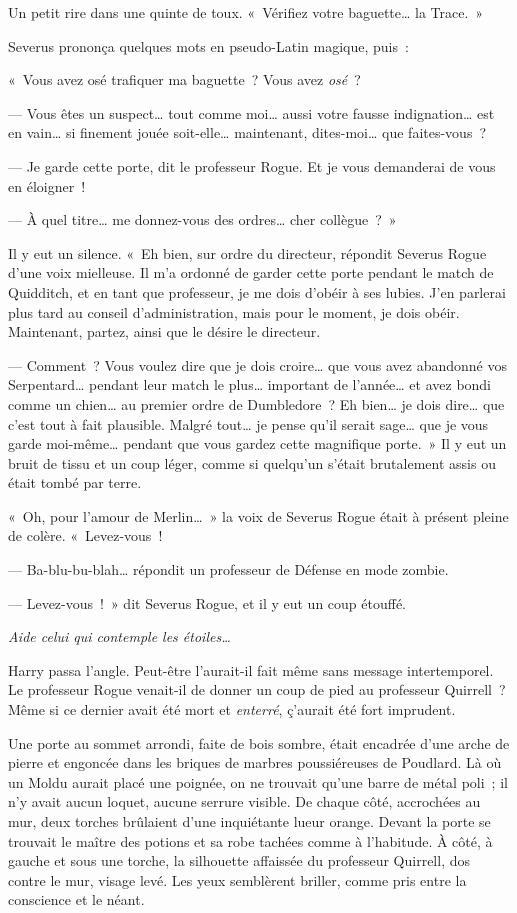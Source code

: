 Un petit rire dans une quinte de toux. «~Vérifiez votre baguette… la Trace.~»

Severus prononça quelques mots en pseudo-Latin magique, puis~:

«~Vous avez osé trafiquer ma baguette~? Vous avez \emph{osé}~?

--- Vous êtes un suspect… tout comme moi… aussi votre fausse indignation… est en vain… si finement jouée soit-elle… maintenant, dites-moi… que faites-vous~?

--- Je garde cette porte, dit le professeur Rogue. Et je vous demanderai de vous en éloigner~!

--- À quel titre… me donnez-vous des ordres… cher collègue~?~»

Il y eut un silence. «~Eh bien, sur ordre du directeur, répondit Severus Rogue d'une voix mielleuse. Il m'a ordonné de garder cette porte pendant le match de Quidditch, et en tant que professeur, je me dois d'obéir à ses lubies. J'en parlerai plus tard au conseil d'administration, mais pour le moment, je dois obéir. Maintenant, partez, ainsi que le désire le directeur.

--- Comment~? Vous voulez dire que je dois croire… que vous avez abandonné vos Serpentard… pendant leur match le plus… important de l'année… et avez bondi comme un chien… au premier ordre de Dumbledore~? Eh bien… je dois dire… que c'est tout à fait plausible. Malgré tout… je pense qu'il serait sage… que je vous garde moi-même… pendant que vous gardez cette magnifique porte.~» Il y eut un bruit de tissu et un coup léger, comme si quelqu'un s'était brutalement assis ou était tombé par terre.

«~Oh, pour l'amour de Merlin…~» la voix de Severus Rogue était à présent pleine de colère. «~Levez-vous~!

--- Ba-blu-bu-blah… répondit un professeur de Défense en mode zombie.

--- Levez-vous~!~» dit Severus Rogue, et il y eut un coup étouffé.

\emph{Aide celui qui contemple les étoiles…}

Harry passa l'angle. Peut-être l'aurait-il fait même sans message intertemporel. Le professeur Rogue venait-il de donner un coup de pied au professeur Quirrell~? Même si ce dernier avait été mort et \emph{enterré}, ç'aurait été fort imprudent.

Une porte au sommet arrondi, faite de bois sombre, était encadrée d'une arche de pierre et engoncée dans les briques de marbres poussiéreuses de Poudlard. Là où un Moldu aurait placé une poignée, on ne trouvait qu'une barre de métal poli~; il n'y avait aucun loquet, aucune serrure visible. De chaque côté, accrochées au mur, deux torches brûlaient d'une inquiétante lueur orange. Devant la porte se trouvait le maître des potions et sa robe tachées comme à l'habitude. À côté, à gauche et sous une torche, la silhouette affaissée du professeur Quirrell, dos contre le mur, visage levé. Les yeux semblèrent briller, comme pris entre la conscience et le néant.


